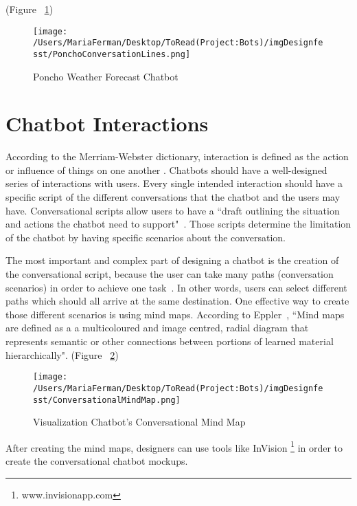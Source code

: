 \documentclass[a4paper,10pt]{article}
\begin{document}
(Figure ~\ref{FigurePoncho})

\begin{figure}
\centering
\texttt{[image: /Users/MariaFerman/Desktop/ToRead(Project:Bots)/imgDesignfesst/PonchoConversationLines.png]}
\caption{Poncho Weather Forecast Chatbot}
\label{FigurePoncho}
\end{figure}

\section{Chatbot Interactions}

According to the Merriam-Webster dictionary, interaction is defined as the action or influence of things on one another \cite{merriam-webster}.
Chatbots should have a well-designed series of interactions with users. Every single intended interaction should have a specific script of the different conversations that the chatbot and the users may have. Conversational scripts allow users to have a ``draft outlining the situation and actions the chatbot need to support"~\cite{CaseStudy}. Those scripts determine the limitation of the chatbot by having specific scenarios about the conversation. 

The most important and complex part of designing a chatbot is the creation of the conversational script, because the user can take many paths (conversation scenarios) in order to achieve one task~\cite{designChatbotConversatio}. In other words, users can select different paths which should all arrive at the same destination. One effective way to create those different scenarios is using mind maps. According to Eppler~\cite{eppler2006comparison}, ``Mind maps are defined as a a multicoloured and image centred, radial diagram that represents semantic or other connections between portions of learned material hierarchically". 
(Figure ~\ref{FigureMindMap})

\begin{figure}
\texttt{[image: /Users/MariaFerman/Desktop/ToRead(Project:Bots)/imgDesignfesst/ConversationalMindMap.png]}
\caption{Visualization Chatbot's Conversational Mind Map}
\label{FigureMindMap}
\end{figure}

After creating the mind maps, designers can use tools like InVision \footnote{www.invisionapp.com} in order to create the conversational chatbot mockups.
\end{document}
